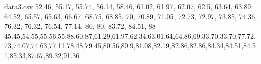 
\begin{filecontents*}{data3.csv}
52.46, 55.17, 55.74, 56.14, 58.46, 61.02, 61.97, 62.07, 62.5, 63.64, 63.89, 64.52, 65.57, 65.63, 66.67, 68.75, 68.85, 70, 70.89, 71.05, 72.73, 72.97, 73.85, 74.36, 76.32, 76.32, 76.54, 77.14, 80, 80, 83.72, 84.51, 88
45.45,54.55,55.56,55.88,60.87,61.29,61.97,62.34,63.01,64,64.86,69.33,70.33,70.77,72.73,74.07,74.63,77.11,78.48,79.45,80.56,80.9,81.08,82.19,82.86,82.86,84.34,84.51,84.51,85.33,87.67,89.32,91.36
\end{filecontents*}

